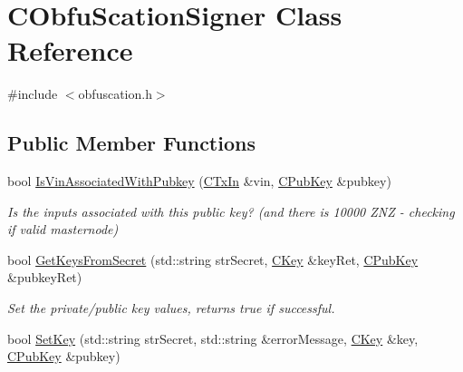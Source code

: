\hypertarget{class_c_obfu_scation_signer}{}\section{C\+Obfu\+Scation\+Signer Class Reference}
\label{class_c_obfu_scation_signer}


{\ttfamily \#include $<$obfuscation.\+h$>$}

\subsection*{Public Member Functions}
\begin{DoxyCompactItemize}
\item 
\mbox{\label{class_c_obfu_scation_signer_ae52356535949db63ac24a3815c0ca117}} 
bool \mbox{\hyperlink{class_c_obfu_scation_signer_ae52356535949db63ac24a3815c0ca117}{Is\+Vin\+Associated\+With\+Pubkey}} (\mbox{\hyperlink{class_c_tx_in}{C\+Tx\+In}} \&vin, \mbox{\hyperlink{class_c_pub_key}{C\+Pub\+Key}} \&pubkey)
\begin{DoxyCompactList}\small\item\em Is the inputs associated with this public key? (and there is 10000 Z\+NZ -\/ checking if valid masternode) \end{DoxyCompactList}\item 
\mbox{\label{class_c_obfu_scation_signer_a1e649a4b0bbeb5921ce2c37a240a98ae}} 
bool \mbox{\hyperlink{class_c_obfu_scation_signer_a1e649a4b0bbeb5921ce2c37a240a98ae}{Get\+Keys\+From\+Secret}} (std\+::string str\+Secret, \mbox{\hyperlink{class_c_key}{C\+Key}} \&key\+Ret, \mbox{\hyperlink{class_c_pub_key}{C\+Pub\+Key}} \&pubkey\+Ret)
\begin{DoxyCompactList}\small\item\em Set the private/public key values, returns true if successful. \end{DoxyCompactList}\item 
\mbox{\label{class_c_obfu_scation_signer_a4a12e41611db1b711d59ac4c3323dd36}} 
bool \mbox{\hyperlink{class_c_obfu_scation_signer_a4a12e41611db1b711d59ac4c3323dd36}{Set\+Key}} (std\+::string str\+Secret, std\+::string \&error\+Message, \mbox{\hyperlink{class_c_key}{C\+Key}} \&key, \mbox{\hyperlink{class_c_pub_key}{C\+Pub\+Key}} \&pubkey)

\end{DoxyCompactItemize}
